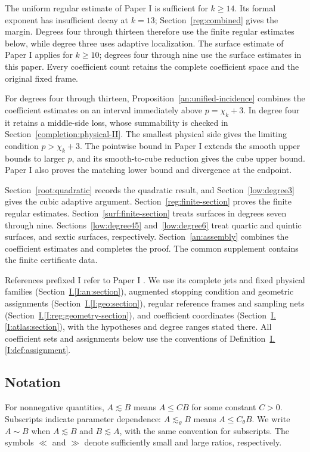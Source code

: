 \documentclass[11pt]{amsart}
\theoremstyle{definition}
\theoremstyle{remark}
\numberwithin{equation}{section}
\newcommand{\partIref}[1]{\hyperref[I:#1]{I.\ref*{I:#1}}}
\begin{document}
The uniform regular estimate of Paper I is sufficient for $k\ge14$. Its formal exponent has insufficient decay at $k=13$; Section~\ref{reg:combined} gives the margin. Degrees four through thirteen therefore use the finite regular estimates below, while degree three uses adaptive localization. The surface estimate of Paper I applies for $k\ge10$; degrees four through nine use the surface estimates in this paper. Every coefficient count retains the complete coefficient space and the original fixed frame.

For degrees four through thirteen, Proposition~\ref{an:unified-incidence} combines the coefficient estimates on an interval immediately above $p=\chi_k+3$. In degree four it retains a middle-side loss, whose summability is checked in Section~\ref{completion:physical-II}. The smallest physical side gives the limiting condition $p>\chi_k+3$. The pointwise bound in Paper I extends the smooth upper bounds to larger $p$, and its smooth-to-cube reduction gives the cube upper bound. Paper I also proves the matching lower bound and divergence at the endpoint.

Section~\ref{root:quadratic} records the quadratic result, and Section~\ref{low:degree3} gives the cubic adaptive argument. Section~\ref{reg:finite-section} proves the finite regular estimates. Section~\ref{surf:finite-section} treats surfaces in degrees seven through nine. Sections~\ref{low:degree45} and~\ref{low:degree6} treat quartic and quintic surfaces, and sextic surfaces, respectively. Section~\ref{an:assembly} combines the coefficient estimates and completes the proof. The common supplement contains the finite certificate data.

References prefixed I refer to Paper I \cite{PaperI}. We use its complete jets and fixed physical families (Section~\partIref{an:section}), augmented stopping condition and geometric assignments (Section~\partIref{geo:section}), regular reference frames and sampling nets (Section~\partIref{reg:geometry-section}), and coefficient coordinates (Section~\partIref{atlas:section}), with the hypotheses and degree ranges stated there. All coefficient sets and assignments below use the conventions of Definition~\partIref{def:assignment}.

\subsection*{Notation}

For nonnegative quantities, $A\lesssim B$ means $A\le CB$ for some constant $C>0$. Subscripts indicate parameter dependence: $A\lesssim_\theta B$ means $A\le C_\theta B$. We write $A\sim B$ when $A\lesssim B$ and $B\lesssim A$, with the same convention for subscripts. The symbols $\ll$ and $\gg$ denote sufficiently small and large ratios, respectively.
\end{document}
